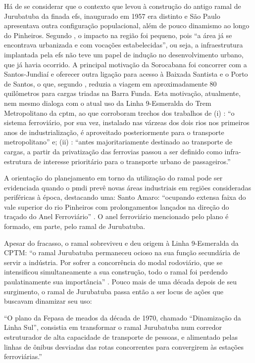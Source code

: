 \documentclass[
article,			%
11pt,				%
oneside,			%
a4paper,			%
english,			%
brazil,				%
sumario=tradicional
]{abntex2}
\begin{document}
	Há de se considerar que o contexto que levou à construção do antigo ramal de Jurubatuba da finada \glsdesc{efs}, inaugurado em 1957 \cite[p.140]{requena2016a} era distinto e São Paulo apresentava outra configuração populacional, além de pouco dinamismo ao longo do Pinheiros. Segundo , o impacto na região foi pequeno, pois ``a área já se encontrava urbanizada e com vocações estabelecidas'', ou seja, a infraestrutura implantada pela \gls{efs} não teve um papel de indução no desenvolvimento urbano, que já havia ocorrido. A principal motivação da Sorocabana foi concorrer com a Santos-Jundiaí e oferecer outra ligação para acesso à Baixada Santista e o Porto de Santos, o que, segundo , reduzia a viagem em aproximadamente 80 quilômetros para cargas triadas na Barra Funda. Esta motivação, atualmente, nem mesmo dialoga com o atual uso da Linha 9-Esmeralda do Trem Metropolitano da \gls{cptm}, ao que corroboram trechos dos trabalhos de (i) : ``o sistema ferroviário, por sua vez, instalado nas várzeas dos dois rios nos primeiros anos de industrialização, é aproveitado posteriormente para o transporte metropolitano'' e; (ii) : ``antes majoritariamente destinado ao transporte de cargas, a partir da privatização das ferrovias passou a ser definido como infra-estrutura de interesse prioritário para o transporte urbano de passageiros.'' 
	
	A orientação do planejamento em torno da utilização do ramal pode ser evidenciada quando o \gls{pmdi} prevê novas áreas industriais em regiões consideradas periféricas à época, destacando uma: Santo Amaro: ``ocupando extensa faixa do vale superior do rio Pinheiros com prolongamentos lançados na direção do traçado do Anel Ferroviário'' \cite[p. 8--9]{gegran1970a}. O anel ferroviário mencionado pelo plano é formado, em parte, pelo ramal de Jurubatuba.
	
	Apesar do fracasso, o ramal sobreviveu e deu origem à Linha 9-Esmeralda da CPTM: ``o ramal Jurubatuba permaneceu ocioso na sua função secundária de servir a indústria. Por sofrer a concorrência do modal rodoviário, que se intensificou simultaneamente a sua construção, todo o ramal foi perdendo paulatinamente sua importância'' \cite[p.141]{requena2016a}. Pouco mais de uma década depois de seu surgimento, o ramal de Jurubatuba passa então a ser locus de ações que buscavam dinamizar seu uso:
	
	\begin{citacao}
		``O plano da Fepasa de meados da década de 1970, chamado ``Dinamização da Linha Sul'', consistia em transformar o ramal Jurubatuba num corredor estruturador de alta capacidade de transporte de pessoas, e alimentado pelas linhas de ônibus desviadas das rotas concorrentes para convergirem às estações ferroviárias.'' \cite[p.143]{requena2016a}
	\end{citacao}
	
\end{document}
